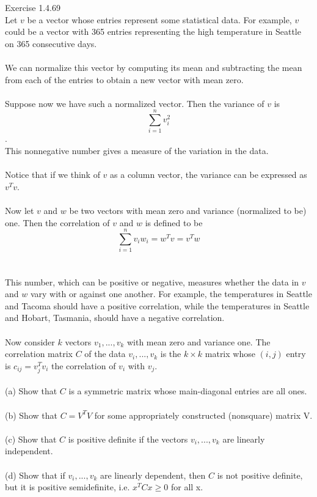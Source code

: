 \documentclass{article}
\begin{document}
	Exercise 1.4.69\\
	Let $v$ be a vector whose entries represent some statistical data. For example, $v$ could be a vector with 365 entries representing the high temperature in Seattle on 365 consecutive days.\\
	\\
	We can normalize this vector by computing its mean and subtracting the mean from each of the entries to obtain a new vector with mean zero.\\
	\\ 
	Suppose now we have such a normalized vector. Then the variance of $v$ is 
	$$\sum_{i=1}^{n}{v_i^2}$$.\\
	This nonnegative number gives a measure of the variation in the data.\\
	\\
	Notice that if we think of $v$ as a column vector, the variance can be expressed as $v^Tv$.\\
	\\
	Now let $v$ and $w$ be two vectors with mean zero and variance (normalized to be) one. Then the correlation of $v$ and $w$ is defined to be 
	$$\sum_{i=1}^{n}{v_iw_i}=w^Tv=v^Tw$$\\
	\\
	This number, which can be positive or negative, measures whether the data in $v$ and $w$ vary with or against one another. For example, the temperatures in Seattle and Tacoma should have a positive correlation, while the temperatures in Seattle and Hobart, Tasmania, should have a negative correlation.\\
	\\
	Now consider $k$ vectors $v_1, ... , v_k$ with mean zero and variance one. The correlation matrix $C$ of the data $v_i, ..., v_k$ is the $k \times k$ matrix whose $(i,j)$ entry is $c_{ij} = v_j^Tv_i$ the correlation of $v_i$ with $v_j$.\\
	\\
	(a) Show that $C$ is a symmetric matrix whose main-diagonal entries are all ones.\\
	\\
	(b) Show that $C = V^TV$ for some appropriately constructed (nonsquare) matrix V.\\
	\\
	(c) Show that $C$ is positive definite if the vectors $v_i, ..., v_k$ are linearly independent.\\
	\\
	(d) Show that if $v_i,..., v_k$ are linearly dependent, then $C$ is not positive definite, but it is positive semidefinite, i.e. $x^TCx \ge 0$ for all x.\\
\end{document}
